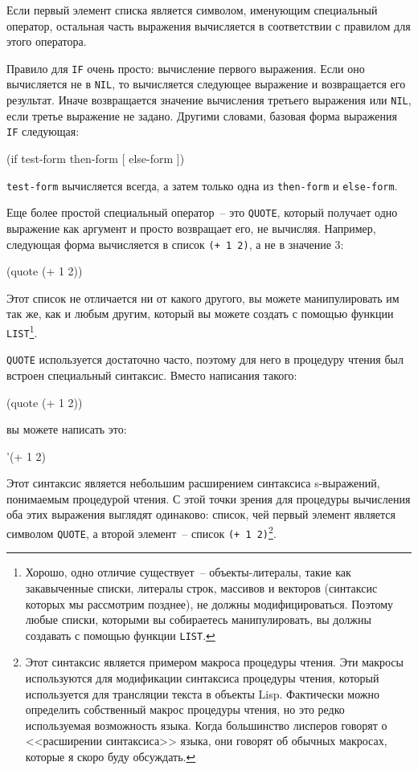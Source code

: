 Если первый элемент списка является символом, именующим специальный оператор, остальная
часть выражения вычисляется в соответствии с правилом для этого оператора.

Правило для \lstinline{IF} очень просто: вычисление первого выражения. Если оно вычисляется
не в \lstinline{NIL}, то вычисляется следующее выражение и возвращается его результат. Иначе
возвращается значение вычисления третьего выражения или \lstinline{NIL}, если третье
выражение не задано. Другими словами, базовая форма выражения \lstinline{IF} следующая:

\begin{myverb}
  (if test-form then-form [ else-form ])
\end{myverb}

\noindent{}\lstinline{test-form} вычисляется всегда, а затем только одна из \lstinline{then-form} и
\lstinline{else-form}.

Еще более простой специальный оператор~-- это \lstinline{QUOTE}, который получает одно
выражение как аргумент и просто возвращает его, не вычисляя. Например, следующая форма
вычисляется в список \lstinline{(+ 1 2)}, а не в значение 3:

\begin{myverb}
  (quote (+ 1 2))
\end{myverb}

Этот список не отличается ни от какого другого, вы можете манипулировать им так же, как и
любым другим, который вы можете создать с помощью функции
\lstinline{LIST}\footnote{Хорошо, одно отличие существует~-- объекты-литералы, такие как
  закавыченные списки, литералы строк, массивов и векторов (синтаксис которых мы рассмотрим
  позднее), не должны модифицироваться. Поэтому любые списки, которыми вы собираетесь
  манипулировать, вы должны создавать с помощью функции \lstinline{LIST}.}.

\lstinline{QUOTE} используется достаточно часто, поэтому для него в процедуру чтения был
встроен специальный синтаксис. Вместо написания такого:

\begin{myverb}
  (quote (+ 1 2))
\end{myverb}

\noindent{}вы можете написать это:

\begin{myverb}
  '(+ 1 2)
\end{myverb}

Этот синтаксис является небольшим расширением синтаксиса s-выражений, понимаемым
процедурой чтения. С этой точки зрения для процедуры вычисления оба этих выражения
выглядят одинаково: список, чей первый элемент является символом \lstinline{QUOTE}, а второй
элемент~-- список \lstinline{(+ 1 2)}\footnote{Этот синтаксис является примером макроса
  процедуры чтения. Эти макросы используются для модификации синтаксиса процедуры чтения,
  который используется для трансляции текста в объекты Lisp. Фактически можно
  определить собственный макрос процедуры чтения, но это редко используемая возможность
  языка. Когда большинство лисперов говорят о <<расширении синтаксиса>> языка, они говорят
  об обычных макросах, которые я скоро буду обсуждать.}.

